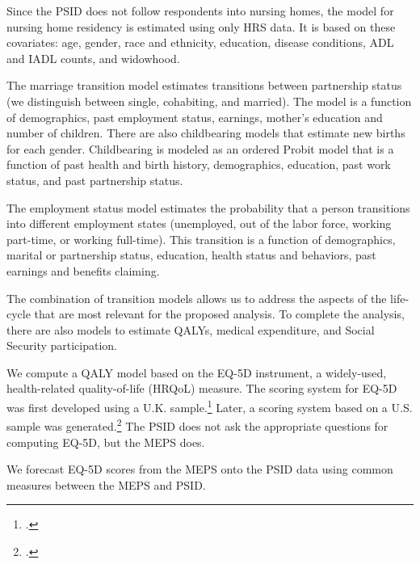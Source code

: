 \noindent Since the PSID does not follow respondents into nursing homes, the model for nursing home residency is estimated using only HRS data. It is based on these covariates: age, gender, race and ethnicity, education, disease conditions, ADL and IADL counts, and widowhood.

\noindent The marriage transition model estimates transitions between partnership status (we distinguish between single, cohabiting, and married).
The model is a function of demographics, past employment status, earnings, mother's education and number of children.
There are also childbearing models that estimate new births for each gender.
Childbearing is modeled as an ordered Probit model that is a function of past health and birth history, demographics, education, past work status, and past partnership status.

\noindent The employment status model estimates the probability that a person transitions into different employment states (unemployed, out of the labor force, working part-time, or working full-time). This transition is a function of demographics, marital or partnership status, education, health status and behaviors, past earnings and benefits claiming.



\noindent The combination of transition models allows us to address the aspects of the life-cycle that are most relevant for the proposed analysis. To complete the analysis, there are also models to estimate QALYs, medical expenditure, and Social Security participation.

\noindent We compute a QALY model based on the EQ-5D instrument, a widely-used, health-related
quality-of-life (HRQoL) measure. %
The scoring system for EQ-5D was first developed using a U.K. sample.\footnote{\citet{Dolan_1997_Modeling_MC}.} Later, a scoring system based on
a U.S. sample was generated.\footnote{\citet{Shaw_etal_2005_EQ5D_MC}.} The PSID does not ask the appropriate questions for computing EQ-5D, but the MEPS does.

\noindent We forecast EQ-5D scores from the MEPS onto the PSID data using common measures between the MEPS and PSID.

